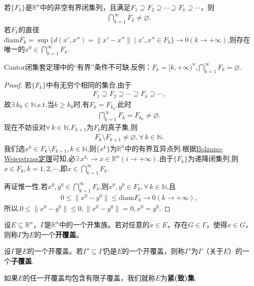 \documentclass[../../main.tex]{subfiles}%
\begin{document}
\begin{theorem}[Cantor闭集套定理]\label{theorem:实变函数--Cantor闭集套定理}
若\(\{F_k\}\)是\(\mathbb{R}^n\)中的非空有界闭集列，且满足\(F_1\supseteq F_2\supseteq\cdots\supseteq F_k\supseteq\cdots\)，则
\begin{align*}
\bigcap_{k = 1}^{\infty}F_k\neq\varnothing.
\end{align*}
若$F_k$的直径$\mathrm{diam}F_k=\sup\{d(x',x'')=\|x'-x''\|\mid x',x''\in F_k\}\to0(k\to+\infty)$,则存在唯一的$ x^0\in\bigcap\limits_{k=1}^{\infty}F_k$.
\end{theorem}
\begin{remark}
Cantor闭集套定理中的“有界”条件不可缺.反例：$F_k=[k,+\infty)^n$,$\bigcap\limits_{k=1}^{\infty}F_k=\varnothing$.
\end{remark}
\begin{proof}

若$\{F_k\}$中有无穷个相同的集合,由于
\begin{align*}
F_1\supseteq F_2\supseteq\cdots\supseteq F_k\supseteq\cdots,
\end{align*}
故$\exists\,k_0\in\mathbb{N}$,s.t.当$k\geqslant k_0$时,有$F_k=F_{k_0}$.此时
\begin{align*}
\bigcap\limits_{k=1}^{\infty}F_k=F_{k_0}\neq\varnothing.
\end{align*}
现在不妨设对$\forall\,k\in\mathbb{N}$,$F_{k+1}$为$F_k$的真子集,则
\begin{align*}
F_k\setminus F_{k+1}\neq\varnothing,\forall\,k\in\mathbb{N}.
\end{align*}
我们选$x^k\in F_k\setminus F_{k+1},k\in\mathbb{N}$,则$\{x^k\}$为$\mathbb{R}^n$中的有界互异点列.根据\hyperref[theorem:R^n中的Bolzano - Weierstrass定理]{Bolzano-Weierstrass定理}可知,必$\exists\,x^{k_i}\to x\in\mathbb{R}^n(i\to+\infty)$.由于$\{F_k\}$为递降闭集列,则$x\in F_k,k=1,2,\cdots$,即$x\in\bigcap\limits_{k=1}^{\infty}F_k$.

再证惟一性.若$x^0,y^0\in\bigcap\limits_{k=1}^{\infty}F_k$,则$x^0,y^0\in F_k,\forall\,k\in\mathbb{N}$,且
\begin{align*}
0\leqslant\|x^0-y^0\|\leqslant\mathrm{diam}F_k\to0(k\to+\infty),
\end{align*}
所以,$0\leqslant\|x^0-y^0\|\leqslant0,\|x^0-y^0\|=0,x^0=y^0$.

\end{proof}

\begin{definition}
设\(E\subseteq\mathbb{R}^n\)，\(\Gamma\)是\(\mathbb{R}^n\)中的一个开集族。若对任意的\(x\in E\)，存在\(G\in\Gamma\)，使得\(x\in G\)，则称\(\Gamma\)为\(E\)的一个\textbf{开覆盖}。

设\(\Gamma\)是\(E\)的一个开覆盖。若\(\Gamma'\subseteq\Gamma\)仍是\(E\)的一个开覆盖，则称\(\Gamma'\)为\(\Gamma\)（关于\(E\)）的一个\textbf{子覆盖}.

如果\(E\)的任一开覆盖均包含有限子覆盖，我们就称\(E\)为\textbf{紧(致)集}.
\end{definition}
\end{document}
